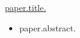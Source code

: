 \documentclass[10pt]{article}
\begin{document}
{\bigskip


\bigskip
{%
\ind \href{ paper.link } { {{paper.title}}. }
\begin{itemize}
	\item {{paper.abstract}}.
\end{itemize}
\medskip

{%












{%

\bigskip


}}}}
\end{document}
